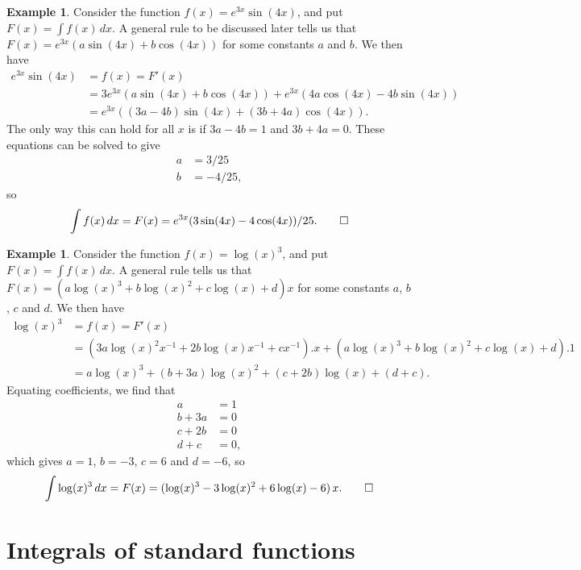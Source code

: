 \documentclass[a4paper]{book}
\theoremstyle{definition}
\newtheorem{example}[theorem]{Example}
\begin{document}
\begin{example}
 Consider the function $f(x)=e^{3x}\sin(4x)$, and put
 $F(x)=\int f(x)\,dx$.  A general rule to be discussed later tells us
 that $F(x)=e^{3x}(a\sin(4x)+b\cos(4x))$ for some constants $a$ and
 $b$.  We then have
 \begin{align*}
  e^{3x}\sin(4x) &= f(x) = F'(x) \\
   &= 3 e^{3x}(a\sin(4x)+b\cos(4x)) +
      e^{3x}(4a\cos(4x)-4b\sin(4x)) \\
   &= e^{3x}((3a-4b)\sin(4x) + (3b+4a)\cos(4x)).
 \end{align*}
 The only way this can hold for all $x$ is if $3a-4b=1$ and
 $3b+4a=0$.  These equations can be solved to give
 \begin{align*}
  a &= 3/25 \\
  b &= -4/25,
 \end{align*}
 so 
 \[ \int f(x)\, dx = F(x) = 
     e^{3x}(3\sin(4x) - 4\cos(4x))/25. \qed
 \]
\end{example}
\begin{example}
 Consider the function $f(x)=\log(x)^3$, and put $F(x)=\int f(x)\,dx$.
 A general rule tells us that
 $F(x)=(a\log(x)^3+b\log(x)^2+c\log(x)+d)x$ for some constants $a$,
 $b$, $c$ and $d$.  We then have 
 \begin{align*}
  \log(x)^3 &= f(x) = F'(x) \\
   &= (3a\log(x)^2x^{-1} + 2b\log(x) x^{-1} + c x^{-1}).x +
      (a\log(x)^3+b\log(x)^2+c\log(x)+d).1 \\
   &= a\log(x)^3 + (b+3a)\log(x)^2 + (c+2b)\log(x) + (d+c).
 \end{align*}
 Equating coefficients, we find that
 \begin{align*}
  a &= 1 \\
  b+3a &= 0 \\
  c+2b &= 0 \\
  d+c  &= 0, 
 \end{align*}
 which gives $a=1$, $b=-3$, $c=6$ and $d=-6$, so 
 \[ \int \log(x)^3\,dx = F(x) =
     (\log(x)^3 - 3\log(x)^2 + 6\log(x) - 6)\,x. \qed
 \] 
\end{example}
\newpage

\section{Integrals of standard functions}
\label{sec-int-standard}
\end{document}
